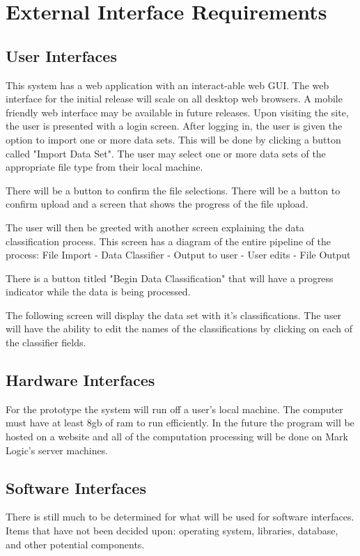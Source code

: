 \documentclass[12pt,oneside,letterpaper]{article}
\begin{document}
\section{External Interface Requirements}
\subsection{User Interfaces}
This system has a web application with an interact-able web GUI. The web interface for the initial release will scale on all desktop web browsers. A mobile friendly web interface may be available in future releases. Upon visiting the site, the user is presented with a login screen. After logging in, the user is given the option to import one or more data sets. This will be done by clicking a button called "Import Data Set". The user may select one or more data sets of the appropriate file type from their local machine. 

There will be a button to confirm the file selections. There will be a button to confirm upload and a screen that shows the progress of the file upload.

The user will then be greeted with another screen explaining the data classification process. This screen has a diagram of the entire pipeline of the process: File Import - Data Classifier - Output to user - User edits - File Output

There is a button titled "Begin Data Classification" that will have a progress indicator while the data is being processed. 

The following screen will display the data set with it's classifications. The user will have the ability to edit the names of the classifications by clicking on each of the classifier fields.

\subsection{Hardware Interfaces}
For the prototype the system will run off a user's local machine. The computer must have at least 8gb of ram to run efficiently. In the future the program will be hosted on a website and all of the computation processing will be done on Mark Logic's server machines.
\subsection{Software Interfaces}
There is still much to be determined for what will be used for software interfaces. Items that have not been decided upon: operating system, libraries, database, and other potential components.
\end{document}
